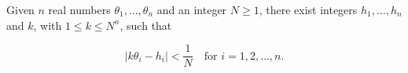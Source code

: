 Given $n$ real numbers $\theta_1, \ldots, \theta_n$ and an integer $N \geq 1$, there exist integers $h_1, \ldots, h_n$ and $k$, with $1 \leq k \leq N^n$, such that

$$|k\theta_i - h_i| < \frac{1}{N} \quad \text{for } i = 1, 2, \ldots, n.$$
